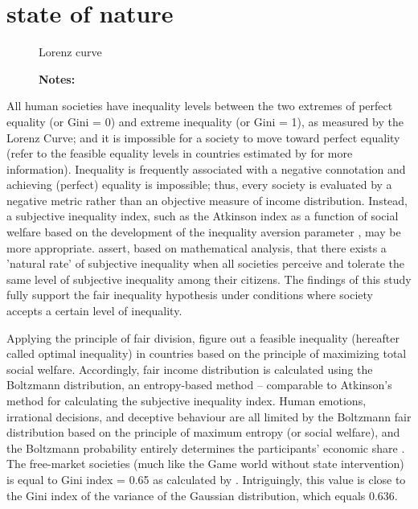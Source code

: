 \section{state of nature}

\begin{figure}[H]
    \centering
    \scalebox{1}{}
    \caption{Lorenz curve}
    \captionsetup{font=footnotesize}
    \caption*{\textbf{Notes:} }
\end{figure}


All human societies have inequality levels between the two extremes of perfect equality (or Gini = 0) and extreme inequality (or Gini = 1), as measured by the Lorenz Curve; and it is impossible for a society to move toward perfect equality (refer to the feasible equality levels in countries estimated by \textcite{park2021getting} for more information). Inequality is frequently associated with a negative connotation and achieving (perfect) equality is impossible; thus, every society is evaluated by a negative metric rather than an objective measure of income distribution. Instead, a subjective inequality index, such as the Atkinson index as a function of social welfare based on the development of the inequality aversion parameter \parencite{atkinson1970measurement}, may be more appropriate. \textcite{lambert2003inequality} assert, based on mathematical analysis, that there exists a 'natural rate' of subjective inequality when all societies perceive and tolerate the same level of subjective inequality among their citizens. The findings of this study fully support the fair inequality hypothesis under conditions where society accepts a certain level of inequality.

Applying the principle of fair division, \textcite{park2021getting} figure out a feasible inequality (hereafter called optimal inequality) in countries based on the principle of maximizing total social welfare. Accordingly, fair income distribution is calculated using the Boltzmann distribution, an entropy-based method – comparable to Atkinson's \parencite*{atkinson1970measurement} method for calculating the subjective inequality index. Human emotions, irrational decisions, and deceptive behaviour are all limited by the Boltzmann fair distribution based on the principle of maximum entropy (or social welfare), and the Boltzmann probability entirely determines the participants’ economic share \parencite{park2022boltzmann}. The free-market societies (much like the Game world without state intervention) is equal to Gini index = 0.65 as calculated by \parencite{fuchs2014behavioral}. Intriguingly, this value is close to the Gini index of the variance of the Gaussian distribution, which equals 0.636.


